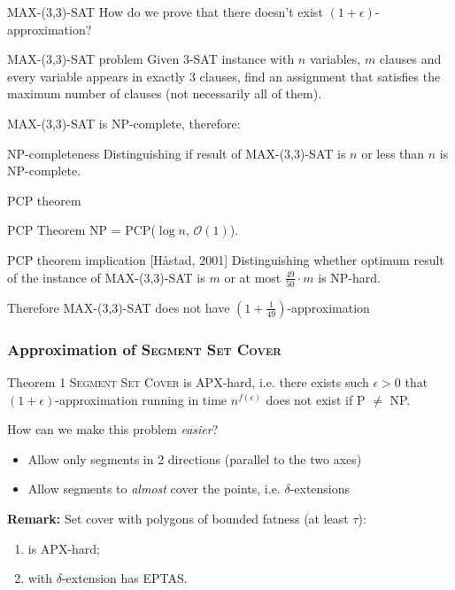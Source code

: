 \documentclass{beamer}
\begin{document}
\begin{frame}{\textsc{MAX-(3,3)-SAT}}
How do we prove that there doesn't exist $(1+\epsilon)$-approximation?


\begin{block}{\textsc{MAX-(3,3)-SAT} problem}
Given 3-SAT instance with $n$ variables, $m$ clauses
and every variable appears in exactly 3 clauses,
find an assignment
that satisfies the maximum number of clauses
(not necessarily all of them).
\end{block}

MAX-(3,3)-SAT is NP-complete, therefore:

\begin{block}{NP-completeness}
Distinguishing if result of MAX-(3,3)-SAT is
$n$ or less than $n$ is NP-complete.
\end{block}
\end{frame}

\begin{frame}{PCP theorem}
\begin{block}{PCP Theorem}
NP = PCP($\log n$, $\mathcal{O}(1)$).
\end{block}

\begin{block}{PCP theorem implication [Håstad, 2001]}
Distinguishing whether optimum result of
the instance of MAX-(3,3)-SAT is $m$
or at most $\frac{49}{50} \cdot m$ is NP-hard.
\end{block}

Therefore MAX-(3,3)-SAT does not have
$(1+\frac{1}{49})$-approximation
\end{frame}


\begin{frame}
\frametitle{Approximation of \textsc{Segment Set Cover}}
\begin{block}{Theorem 1}
	\textsc{Segment Set Cover} is APX-hard, i.e.
	there exists such $\epsilon>0$
	that $(1+\epsilon)$-approximation 
	running in time $n^{f(\epsilon)}$ does not exist if P $\neq$ NP.
\end{block}

How can we make this problem \textit{easier}?
\begin{itemize}
\item Allow only segments in 2 directions (parallel to the two axes)
\item Allow segments to \textit{almost} cover the points, i.e. $\delta$-extensions
\end{itemize}

\pause

\bigskip

\textbf{Remark:}
	Set cover with polygons of bounded fatness (at least $\tau$):
	\begin{enumerate}
	\item is APX-hard;
	\item with $\delta$-extension has EPTAS.
	\end{enumerate}

\end{frame}
\end{document}
